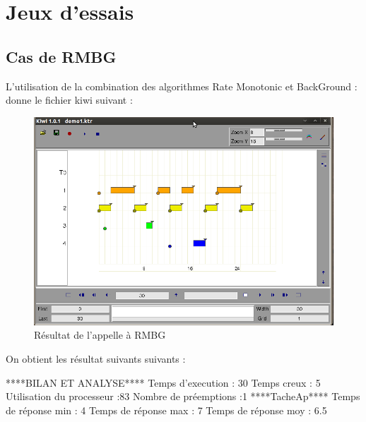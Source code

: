 \chapter{Jeux d'essais}
\section{Cas de RMBG}
L'utilisation de la combination des algorithmes Rate Monotonic et BackGround : donne  le fichier kiwi suivant : 
\begin{figure}[htbp]
  \centering
  \includegraphics[scale=0.60]{img/RMBG}
  \caption{Résultat de l'appelle à RMBG}
  \label{fig:RMBG}
\end{figure}
On obtient les résultat suivants suivants : 

****BILAN ET ANALYSE****
Temps d'execution : 30
Temps creux : 5
Utilisation du processeur :83
Nombre de préemptions :1
****TacheAp****
Temps de réponse min : 4
Temps de réponse max : 7
Temps de réponse moy : 6.5
